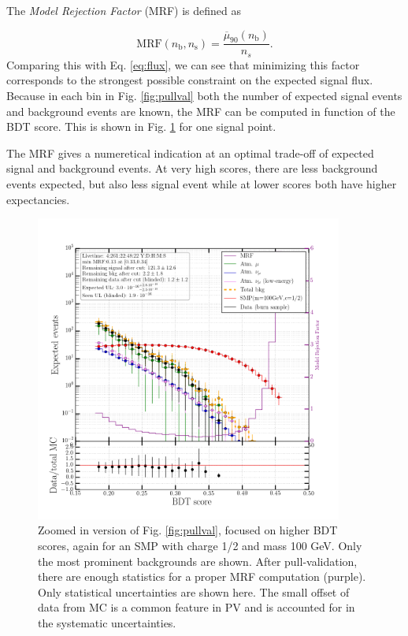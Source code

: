 \noindent The \textit{Model Rejection Factor} (MRF) is defined as 

\begin{equation}
\textrm{MRF}\left(n_\textrm{b}, n_\textrm{s}\right) =  \frac{\overline{\mu}_{90}\left(n_\textrm{b}\right)}{n_s}.
\end{equation}
\noindent Comparing this with Eq. \ref{eq:flux}, we can see that minimizing this factor corresponds to the strongest possible constraint on the expected signal flux. Because in each bin in Fig. \ref{fig:pullval} both the number of expected signal events and background events are known, the MRF can be computed in function of the BDT score. This is shown in Fig. \ref{fig:mrf} for one signal point.

The MRF gives a numeretical indication at an optimal trade-off of expected signal and background events. At very high scores, there are less background events expected, but also less signal event while at lower scores both have higher expectancies.\\

\begin{figure}
\centering
\includegraphics[width=0.9\textwidth]{chapter8/img/ModelRejectionFactor_percentile_0p9_signal_m_100_ch_1ovr2_noSYST.png}
\caption{Zoomed in version of Fig. \ref{fig:pullval}, focused on higher BDT scores, again for an SMP with charge 1/2 and mass 100 GeV. Only the most prominent backgrounds are shown. After pull-validation, there are enough statistics for a proper MRF computation (purple). Only statistical uncertainties are shown here. The small offset of data from MC is a common feature in PV and is accounted for in the systematic uncertainties.}
\label{fig:mrf}
\end{figure}

